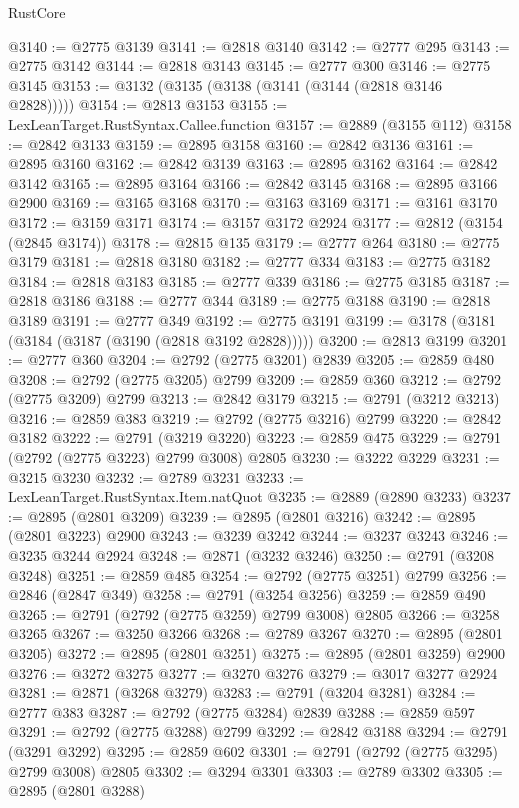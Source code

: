 \begin{lexlean}{RustCore}
\begin{coremodule}
@3140 := @2775 @3139
@3141 := @2818 @3140
@3142 := @2777 @295
@3143 := @2775 @3142
@3144 := @2818 @3143
@3145 := @2777 @300
@3146 := @2775 @3145
@3153 := @3132 (@3135 (@3138 (@3141 (@3144 (@2818 @3146 @2828)))))
@3154 := @2813 @3153
@3155 := LexLeanTarget.RustSyntax.Callee.function
@3157 := @2889 (@3155 @112)
@3158 := @2842 @3133
@3159 := @2895 @3158
@3160 := @2842 @3136
@3161 := @2895 @3160
@3162 := @2842 @3139
@3163 := @2895 @3162
@3164 := @2842 @3142
@3165 := @2895 @3164
@3166 := @2842 @3145
@3168 := @2895 @3166 @2900
@3169 := @3165 @3168
@3170 := @3163 @3169
@3171 := @3161 @3170
@3172 := @3159 @3171
@3174 := @3157 @3172 @2924
@3177 := @2812 (@3154 (@2845 @3174))
@3178 := @2815 @135
@3179 := @2777 @264
@3180 := @2775 @3179
@3181 := @2818 @3180
@3182 := @2777 @334
@3183 := @2775 @3182
@3184 := @2818 @3183
@3185 := @2777 @339
@3186 := @2775 @3185
@3187 := @2818 @3186
@3188 := @2777 @344
@3189 := @2775 @3188
@3190 := @2818 @3189
@3191 := @2777 @349
@3192 := @2775 @3191
@3199 := @3178 (@3181 (@3184 (@3187 (@3190 (@2818 @3192 @2828)))))
@3200 := @2813 @3199
@3201 := @2777 @360
@3204 := @2792 (@2775 @3201) @2839
@3205 := @2859 @480
@3208 := @2792 (@2775 @3205) @2799
@3209 := @2859 @360
@3212 := @2792 (@2775 @3209) @2799
@3213 := @2842 @3179
@3215 := @2791 (@3212 @3213)
@3216 := @2859 @383
@3219 := @2792 (@2775 @3216) @2799
@3220 := @2842 @3182
@3222 := @2791 (@3219 @3220)
@3223 := @2859 @475
@3229 := @2791 (@2792 (@2775 @3223) @2799 @3008) @2805
@3230 := @3222 @3229
@3231 := @3215 @3230
@3232 := @2789 @3231
@3233 := LexLeanTarget.RustSyntax.Item.natQuot
@3235 := @2889 (@2890 @3233)
@3237 := @2895 (@2801 @3209)
@3239 := @2895 (@2801 @3216)
@3242 := @2895 (@2801 @3223) @2900
@3243 := @3239 @3242
@3244 := @3237 @3243
@3246 := @3235 @3244 @2924
@3248 := @2871 (@3232 @3246)
@3250 := @2791 (@3208 @3248)
@3251 := @2859 @485
@3254 := @2792 (@2775 @3251) @2799
@3256 := @2846 (@2847 @349)
@3258 := @2791 (@3254 @3256)
@3259 := @2859 @490
@3265 := @2791 (@2792 (@2775 @3259) @2799 @3008) @2805
@3266 := @3258 @3265
@3267 := @3250 @3266
@3268 := @2789 @3267
@3270 := @2895 (@2801 @3205)
@3272 := @2895 (@2801 @3251)
@3275 := @2895 (@2801 @3259) @2900
@3276 := @3272 @3275
@3277 := @3270 @3276
@3279 := @3017 @3277 @2924
@3281 := @2871 (@3268 @3279)
@3283 := @2791 (@3204 @3281)
@3284 := @2777 @383
@3287 := @2792 (@2775 @3284) @2839
@3288 := @2859 @597
@3291 := @2792 (@2775 @3288) @2799
@3292 := @2842 @3188
@3294 := @2791 (@3291 @3292)
@3295 := @2859 @602
@3301 := @2791 (@2792 (@2775 @3295) @2799 @3008) @2805
@3302 := @3294 @3301
@3303 := @2789 @3302
@3305 := @2895 (@2801 @3288)

\end{coremodule}
\end{lexlean}
